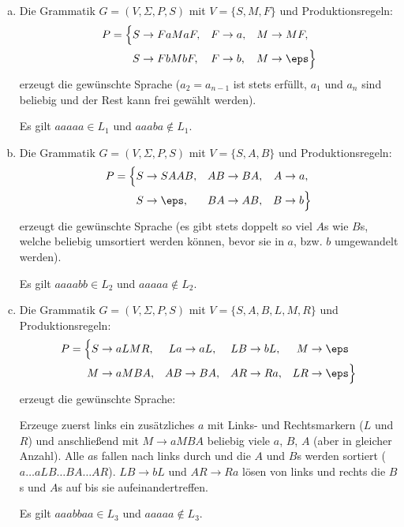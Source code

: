 \documentclass{mywork}
\begin{document}
\begin{aufgabe}
	\begin{enumerate}[a)]
		\item
			Die Grammatik $G = (V, \Sigma, P, S)$ mit $V=\{S,M,F\}$ und Produktionsregeln:
			\begin{align*}
				P = \Big\{
				S &\to FaMaF, & F &\to a, & M &\to MF, \\
				S &\to FbMbF, & F &\to b, & M &\to \eps \Big\}
			\end{align*}
			erzeugt die gewünschte Sprache ($a_2 = a_{n-1}$ ist stets erfüllt, $a_1$ und $a_n$ sind beliebig und der Rest kann frei gewählt werden).

			Es gilt $aaaaa \in L_1$ und $aaaba \not\in L_1$.
		\item
			Die Grammatik $G = (V, \Sigma, P, S)$ mit $V=\{S,A,B\}$ und Produktionsregeln:
			\begin{align*}
				P = \Big\{
				S &\to SAAB, & AB &\to BA, & A &\to a, \\
				S &\to \eps, & BA &\to AB, & B &\to b \Big\}
			\end{align*}
			erzeugt die gewünschte Sprache (es gibt stets doppelt so viel $A$s wie $B$s, welche beliebig umsortiert werden können, bevor sie in $a$, bzw. $b$ umgewandelt werden).

			Es gilt $aaaabb \in L_2$ und $aaaaa \not\in L_2$. 
		\item
			Die Grammatik $G = (V, \Sigma, P, S)$ mit $V=\{S,A,B,L,M,R\}$ und Produktionsregeln:
			\begin{align*}
				P = \Big\{
				S &\to aLMR, & La &\to aL, & LB &\to bL, & M &\to \eps \\
				M &\to aMBA, & AB &\to BA, & AR &\to Ra, & LR &\to \eps \Big\}
			\end{align*}
			erzeugt die gewünschte Sprache:

			Erzeuge zuerst links ein zusätzliches $a$ mit Links- und Rechtsmarkern ($L$ und $R$) und anschließend mit $M\to aMBA$ beliebig viele $a$, $B$, $A$ (aber in gleicher Anzahl).
			Alle $a$s fallen nach links durch und die $A$ und $B$s werden sortiert ($a\dotso aLB\dotso BA\dotso AR$).
			$LB \to bL$ und $AR \to Ra$ lösen von links und rechts die $B$s und $A$s auf bis sie aufeinandertreffen.

			Es gilt $aaabbaa \in L_3$ und $aaaaa \not\in L_3$. 
	\end{enumerate}
\end{aufgabe}
\end{document}
